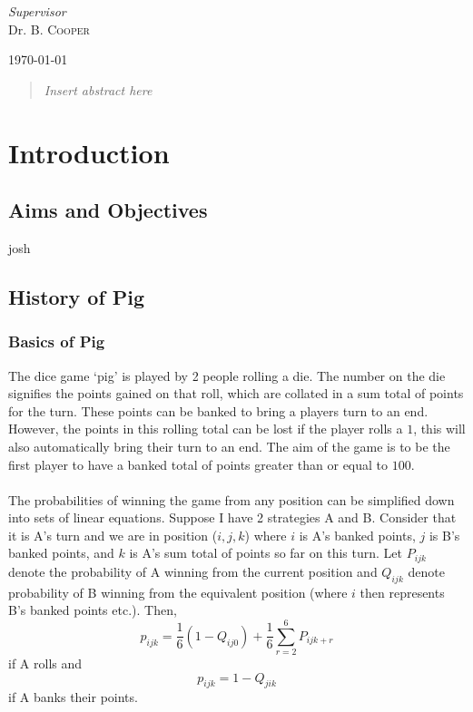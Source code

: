 \documentclass[a4paper,titlepage]{article}
\begin{document}
\begin{titlepage}
	\vfill\vfill
	\textit{Supervisor}\\
	Dr. B. \textsc{Cooper}


	\vfill\vfill\vfill

	{\large\today}
	\vfill


	\newpage
	\begin{abstract}
	\textit{Insert abstract here}
	\end{abstract}
\end{titlepage}


\tableofcontents
\newpage

\section{Introduction}
\subsection{Aims and Objectives}
josh
\subsection{History of Pig}
\subsubsection{Basics of Pig}
The dice game `pig' is played by 2 people rolling a die. The number on the die signifies the points gained on that roll, which are collated in a sum total of points for the turn. These points can be banked to bring a players turn to an end. However, the points in this rolling total can be lost if the player rolls a $1$, this will also automatically bring their turn to an end. The aim of the game is to be the first player to have a banked total of points greater than or equal to $100$.
\\
\\
The probabilities of winning the game from any position can be simplified down into sets of linear equations. Suppose I have 2 strategies A and B. Consider that it is A's turn and we are in position ($i,j,k$) where $i$ is A's banked points, $j$ is B's banked points, and $k$ is A's sum total of points so far on this turn. Let $P_{ijk}$ denote the probability of A winning from the current position and $Q_{ijk}$ denote probability of B winning from the equivalent position (where $i$ then represents B's banked points etc.). Then, \begin{equation}\label{1.2.1.a}
p_{ijk} = \dfrac{1}{6} (1-Q_{ij0}) + \dfrac{1}{6}\sum^{6}_{r=2}P_{ijk+r}
\end{equation}
 if A rolls and
 \begin{equation}\label{1.2.1.b}
 p_{ijk} = 1-Q_{jik}
 \end{equation}
 if A banks their points.
\end{document}
